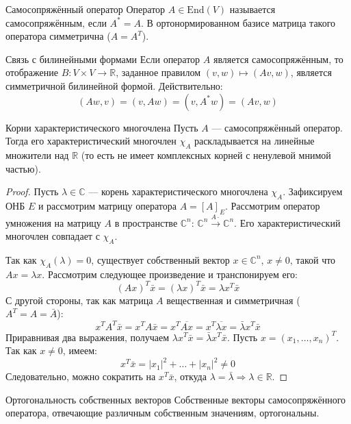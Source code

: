 \begin{Definition}{Самосопряжённый оператор}{}
	Оператор $A \in \mathrm{End}(V)$ называется самосопряжённым, если $A^* = A$.
	В ортонормированном базисе матрица такого оператора симметрична ($A = A^T$).
\end{Definition}

\begin{Remark}{Связь с билинейными формами}{}
	Если оператор $A$ является самосопряжённым, то отображение $B: V \times V \to \mathbb{R}$, заданное правилом $(v, w) \mapsto (Av, w)$, является симметричной билинейной формой. Действительно:
	\[
	(Aw, v) = (v, Aw) = (v, A^* w) = (Av, w)
	\]
\end{Remark}

\begin{Proposition}{Корни характеристического многочлена}{}
	Пусть $A$ — самосопряжённый оператор. Тогда его характеристический многочлен $\chi_A$ раскладывается на линейные множители над $\mathbb{R}$ (то есть не имеет комплексных корней с ненулевой мнимой частью).
\end{Proposition}

\begin{proof}
	Пусть $\lambda \in \mathbb{C}$ — корень характеристического многочлена $\chi_A$. Зафиксируем ОНБ $E$ и рассмотрим матрицу оператора $A = [A]_E$.
	Рассмотрим оператор умножения на матрицу $A$ в пространстве $\mathbb{C}^n$: $\mathbb{C}^n \xrightarrow{A \cdot} \mathbb{C}^n$. Его характеристический многочлен совпадает с $\chi_A$.
	
	Так как $\chi_A(\lambda) = 0$, существует собственный вектор $x \in \mathbb{C}^n$, $x \neq 0$, такой что $Ax = \lambda x$.
	Рассмотрим следующее произведение и транспонируем его:
	\[
	(Ax)^T \bar{x} = (\lambda x)^T \bar{x} = \lambda x^T \bar{x}
	\]
	С другой стороны, так как матрица $A$ вещественная и симметричная ($A^T = A = \bar{A}$):
	\[
	x^T A^T \bar{x} = x^T A \bar{x} = x^T \overline{A x} = x^T \overline{\lambda x} = \bar{\lambda} x^T \bar{x}
	\]
	Приравнивая два выражения, получаем $\lambda x^T \bar{x} = \bar{\lambda} x^T \bar{x}$.
	Пусть $x = (x_1, \dots, x_n)^T$. Так как $x \neq 0$, имеем:
	\[
	x^T \bar{x} = |x_1|^2 + \dots + |x_n|^2 \neq 0
	\]
	Следовательно, можно сократить на $x^T \bar{x}$, откуда $\lambda = \bar{\lambda} \Rightarrow \lambda \in \mathbb{R}$.
\end{proof}

\begin{Proposition}{Ортогональность собственных векторов}{}
	Собственные векторы самосопряжённого оператора, отвечающие различным собственным значениям, ортогональны.
\end{Proposition}

